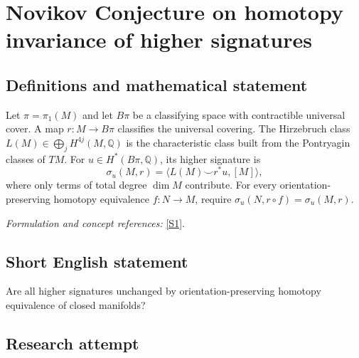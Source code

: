 \documentclass[11pt,a4paper]{article}
\newcommand{\Q}{\mathbb{Q}}
\newcommand{\sref}[2]{\hyperlink{source:#1:#2}{[S#2]}}
\newif\ifshowcatalogue
\newcommand{\cataloguescope}[1]{\ifshowcatalogue
 \paragraph{Exact scope in the supplied catalogue.}
 \begin{quote}\small #1\end{quote}\fi}
\numberwithin{equation}{section}
\begin{document}
\setcounter{section}{55}
\clearpage
\section{\texorpdfstring{Novikov Conjecture on homotopy invariance of higher signatures}{Novikov Conjecture on homotopy invariance of higher signatures}}\label{56}
\subsection{Definitions and mathematical statement}
Let $\pi=\pi_1(M)$ and let $B\pi$ be a classifying space with contractible universal cover. A map $r:M\to B\pi$ classifies the universal covering. The Hirzebruch class $L(M)\in\bigoplus_jH^{4j}(M,\Q)$ is the characteristic class built from the Pontryagin classes of $TM$. For $u\in H^*(B\pi,\Q)$, its higher signature is
\[
 \sigma_u(M,r)=\langle L(M)\smile r^*u,[M]\rangle,
\]
where only terms of total degree $\dim M$ contribute. For every orientation-preserving homotopy equivalence $f:N\to M$, require $\sigma_u(N,r\circ f)=\sigma_u(M,r)$.
\par\smallskip\textit{Formulation and concept references:} \sref{56}{1}.
\cataloguescope{For every closed oriented smooth manifold M, every u in H\textasciicircum{}*(B pi\_1(M); Q), and every classifying map r, prove that the higher signature <L(M) cup r\textasciicircum{}*u,[M]> is invariant under orientation-preserving homotopy equivalence.}
\subsection{Short English statement}
Are all higher signatures unchanged by orientation-preserving homotopy equivalence of closed manifolds?
\subsection{Research attempt}
\end{document}

